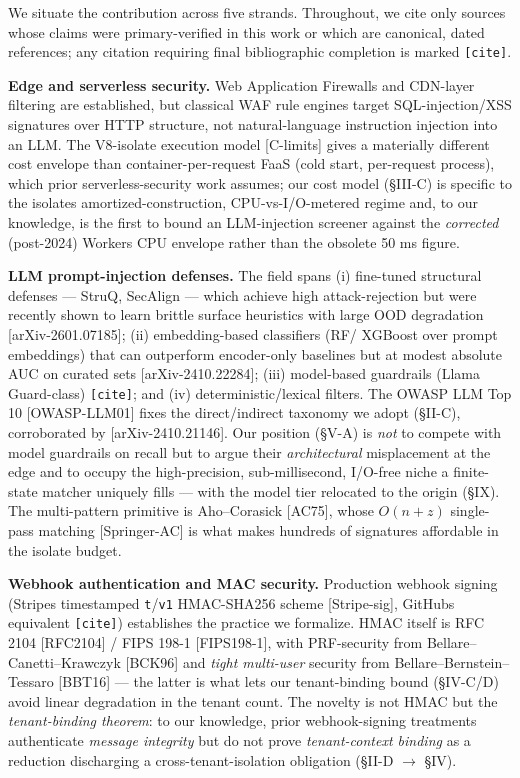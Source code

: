 We situate the contribution across five strands. Throughout, we cite
only sources whose claims were primary-verified in this work or which
are canonical, dated references; any citation requiring final
bibliographic completion is marked \passthrough{\lstinline![cite]!}.

\textbf{Edge and serverless security.} Web Application Firewalls and
CDN-layer filtering are established, but classical WAF rule engines
target SQL-injection/XSS signatures over HTTP structure, not
natural-language instruction injection into an LLM. The V8-isolate
execution model {[}C-limits{]} gives a materially different cost
envelope than container-per-request FaaS (cold start, per-request
process), which prior serverless-security work assumes; our cost model
(§III-C) is specific to the isolate\textquotesingle s
amortized-construction, CPU-vs-I/O-metered regime and, to our knowledge,
is the first to bound an LLM-injection screener against the
\emph{corrected} (post-2024) Workers CPU envelope rather than the
obsolete 50 ms figure.

\textbf{LLM prompt-injection defenses.} The field spans (i) fine-tuned
structural defenses --- StruQ, SecAlign --- which achieve high
attack-rejection but were recently shown to learn brittle surface
heuristics with large OOD degradation {[}arXiv-2601.07185{]}; (ii)
embedding-based classifiers (RF/ XGBoost over prompt embeddings) that
can outperform encoder-only baselines but at modest absolute AUC on
curated sets {[}arXiv-2410.22284{]}; (iii) model-based guardrails (Llama
Guard-class) \passthrough{\lstinline![cite]!}; and (iv)
deterministic/lexical filters. The OWASP LLM Top 10 {[}OWASP-LLM01{]}
fixes the direct/indirect taxonomy we adopt (§II-C), corroborated by
{[}arXiv-2410.21146{]}. Our position (§V-A) is \emph{not} to compete
with model guardrails on recall but to argue their \emph{architectural}
misplacement at the edge and to occupy the high-precision,
sub-millisecond, I/O-free niche a finite-state matcher uniquely fills
--- with the model tier relocated to the origin (§IX). The multi-pattern
primitive is Aho--Corasick {[}AC75{]}, whose \(O(n+z)\) single-pass
matching {[}Springer-AC{]} is what makes hundreds of signatures
affordable in the isolate budget.

\textbf{Webhook authentication and MAC security.} Production webhook
signing (Stripe\textquotesingle s timestamped
\passthrough{\lstinline!t!}/\passthrough{\lstinline!v1!} HMAC-SHA256
scheme {[}Stripe-sig{]}, GitHub\textquotesingle s equivalent
\passthrough{\lstinline![cite]!}) establishes the practice we formalize.
HMAC itself is RFC 2104 {[}RFC2104{]} / FIPS 198-1 {[}FIPS198-1{]}, with
PRF-security from Bellare--Canetti--Krawczyk {[}BCK96{]} and \emph{tight
multi-user} security from Bellare--Bernstein--Tessaro {[}BBT16{]} ---
the latter is what lets our tenant-binding bound (§IV-C/D) avoid linear
degradation in the tenant count. The novelty is not HMAC but the
\emph{tenant-binding theorem}: to our knowledge, prior webhook-signing
treatments authenticate \emph{message integrity} but do not prove
\emph{tenant-context binding} as a reduction discharging a
cross-tenant-isolation obligation (§II-D $\to$ §IV).

